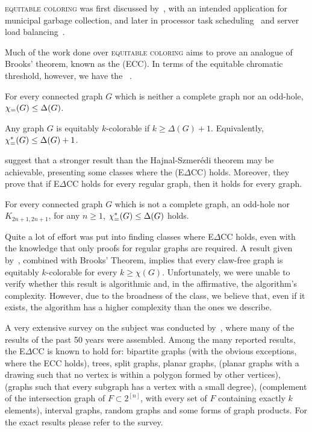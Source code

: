 \textsc{equitable coloring} was first discussed by~\citep{first_equitable}, with an intended application for municipal garbage collection, and later in processor task scheduling~\citep{mutual_exclusion_scheduling} and server load balancing~\citep{domain_decomposition}.

Much of the work done over \textsc{equitable coloring} aims to prove an analogue of Brooks' theorem, known as the  (ECC).
In terms of the equitable chromatic threshold, however, we have the ~\citep{hajnal_szmeredi_theorem}.

\begin{conjecture*}[ECC]
    For every connected graph $G$ which is neither a complete graph nor an odd-hole, $\chi_{\mathcal{=}}(G) \leq \Delta(G)$.
\end{conjecture*}

\begin{theorem*}
    Any graph $G$ is equitably $k$-colorable if $k \geq \Delta(G) + 1$. Equivalently, $\chi_{\mathcal{=}}^*(G) \leq \Delta(G) + 1$.
\end{theorem*}

\citep{e_delta_cc} suggest that a stronger result than the Hajnal-Szmerédi theorem may be achievable, presenting some classes where the  (E$\Delta$CC) holds.
Moreover, they prove that if E$\Delta$CC holds for every regular graph, then it holds for every graph.

\begin{conjecture*}[E$\Delta$CC]
    For every connected graph $G$ which is not a complete graph, an odd-hole nor $K_{2n+1, 2n+1}$, for any $n \geq 1$, $\chi_{\mathcal{=}}^*(G) \leq \Delta(G)$ holds.
\end{conjecture*}

Quite a lot of effort was put into finding classes where E$\Delta$CC holds, even with the knowledge that only proofs for regular graphs are required.
A result given by~\citep{claw_free_de_werra}, combined with Brooks' Theorem, implies that every claw-free graph is equitably $k$-colorable for every $k \geq \chi(G)$.
Unfortunately, we were unable to verify whether this result is algorithmic and, in the affirmative, the algorithm's complexity.
However, due to the broadness of the class, we believe that, even if it exists, the algorithm has a higher complexity than the ones we describe.

A very extensive survey on the subject was conducted by~\citep{equitable_survey}, where many of the results of the past 50 years were assembled.
Among the many reported results, the E$\Delta$CC is known to hold for:
bipartite graphs (with the obvious exceptions, where the ECC holds),
trees,
split graphs,
planar graphs,
 (planar graphs with a drawing such that no vertex is within a polygon formed by other vertices),
 (graphs such that every subgraph has a vertex with a small degree),
 (complement of the intersection graph of $F \subset 2^{[n]}$, with every set of $F$ containing exactly $k$ elements),
interval graphs,
random graphs and
some forms of graph products.
For the exact results please refer to the survey.

